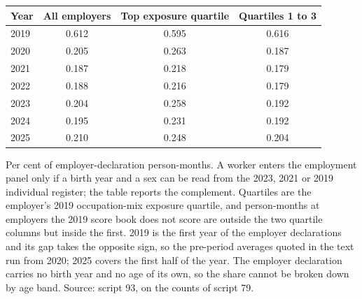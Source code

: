 \begin{tabular}{lccc}
\toprule
Year & All employers & Top exposure quartile & Quartiles 1 to 3 \\
\midrule
2019 & 0.612 & 0.595 & 0.616 \\
2020 & 0.205 & 0.263 & 0.187 \\
2021 & 0.187 & 0.218 & 0.179 \\
2022 & 0.188 & 0.216 & 0.179 \\
2023 & 0.204 & 0.258 & 0.192 \\
2024 & 0.195 & 0.231 & 0.192 \\
2025 & 0.210 & 0.248 & 0.204 \\
\bottomrule
\end{tabular}
\begin{minipage}{0.92\textwidth}\footnotesize\vspace{4pt}
Per cent of employer-declaration person-months. A worker enters the employment panel only if a birth year and a sex can be read from the 2023, 2021 or 2019 individual register; the table reports the complement. Quartiles are the employer's 2019 occupation-mix exposure quartile, and person-months at employers the 2019 score book does not score are outside the two quartile columns but inside the first. 2019 is the first year of the employer declarations and its gap takes the opposite sign, so the pre-period averages quoted in the text run from 2020; 2025 covers the first half of the year. The employer declaration carries no birth year and no age of its own, so the share cannot be broken down by age band. Source: script 93, on the counts of script 79.
\end{minipage}
